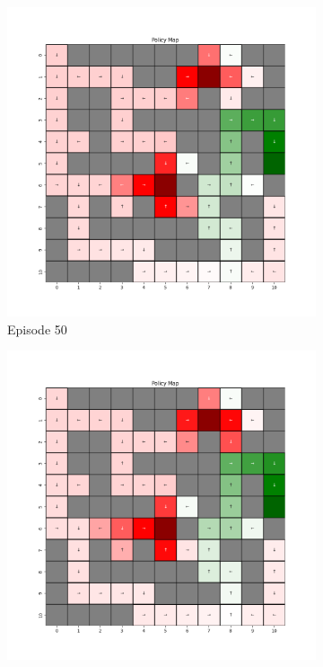 \documentclass{assignment}
\begin{document}
\begin{figure}[H]
\begin{subfigure}{0.3\textwidth}
        \includegraphics[width=\textwidth]{figures/policy_td/alpha_sweep/policy_alpha_0.5_gamma_0.95_epsilon_0.2_iteration_50.png}
    \caption{Episode 50}
    \end{subfigure}\hfill
    \begin{subfigure}{0.3\textwidth}
        \includegraphics[width=\textwidth]{figures/policy_td/alpha_sweep/policy_alpha_0.5_gamma_0.95_epsilon_0.2_iteration_100.png}

\end{subfigure}
\end{figure}
\end{document}
